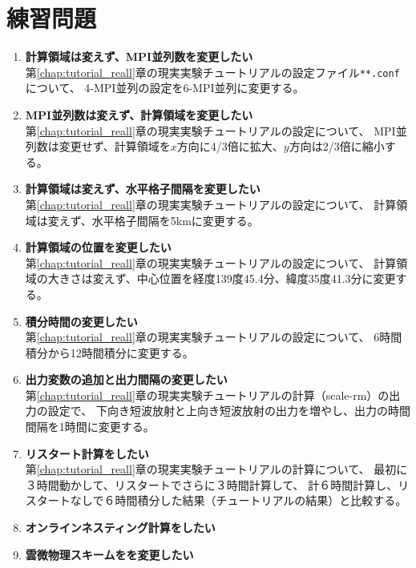 \section*{練習問題}

\begin{enumerate}
\item {\bf 計算領域は変えず、MPI並列数を変更したい}\\
第\ref{chap:tutorial_reall}章の現実実験チュートリアルの設定ファイル\verb|**.conf|について、
4-MPI並列の設定を6-MPI並列に変更する。

\item {\bf MPI並列数は変えず、計算領域を変更したい}\\
第\ref{chap:tutorial_reall}章の現実実験チュートリアルの設定について、
MPI並列数は変更せず、計算領域を$x$方向に4/3倍に拡大、$y$方向は2/3倍に縮小する。

\item {\bf 計算領域は変えず、水平格子間隔を変更したい}\\
第\ref{chap:tutorial_reall}章の現実実験チュートリアルの設定について、
計算領域は変えず、水平格子間隔を5kmに変更する。

\item {\bf 計算領域の位置を変更したい}\\
第\ref{chap:tutorial_reall}章の現実実験チュートリアルの設定について、
計算領域の大きさは変えず、中心位置を経度139度45.4分、緯度35度41.3分に変更する。

\item {\bf 積分時間の変更したい}\\
第\ref{chap:tutorial_reall}章の現実実験チュートリアルの設定について、
6時間積分から12時間積分に変更する。

\item {\bf 出力変数の追加と出力間隔の変更したい}\\
第\ref{chap:tutorial_reall}章の現実実験チュートリアルの計算（scale-rm）の出力の設定で、
下向き短波放射と上向き短波放射の出力を増やし、出力の時間間隔を1時間に変更する。

\item {\bf リスタート計算をしたい}\\
第\ref{chap:tutorial_reall}章の現実実験チュートリアルの計算について、
最初に３時間動かして、リスタートでさらに３時間計算して、
計６時間計算し、リスタートなしで６時間積分した結果（チュートリアルの結果）と比較する。

\item {\bf オンラインネスティング計算をしたい}\\

\item {\bf 雲微物理スキームをを変更したい}\\


\end{enumerate}

